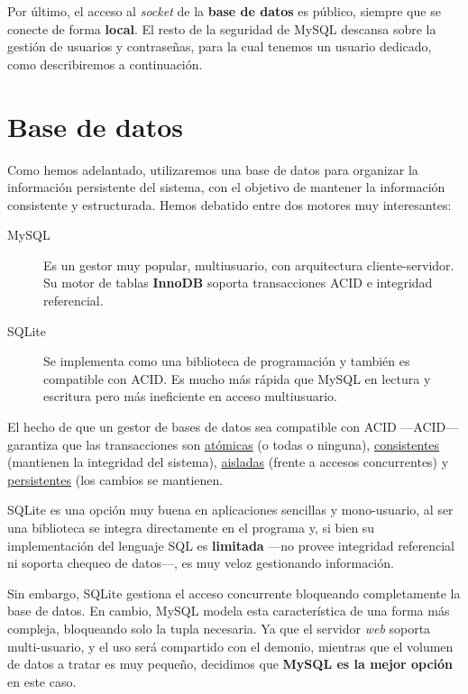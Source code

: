 Por último, el acceso al \textit{socket} de la \textbf{base de datos} es público, siempre que se conecte de forma \textbf{local}. El resto de la seguridad de MySQL descansa sobre la gestión de usuarios y contraseñas, para la cual tenemos un usuario dedicado, como describiremos a continuación.

\section{Base de datos}

Como hemos adelantado, utilizaremos una base de datos para organizar la información persistente del sistema, con el objetivo de mantener la información consistente y estructurada. Hemos debatido entre dos motores muy interesantes:

\begin{description}
	\item[MySQL] Es un gestor muy popular, multiusuario, con arquitectura cliente-servidor. Su motor de tablas \textbf{InnoDB} soporta transacciones \acrshort{ACID} e integridad referencial. \cite{wiki_innodb}
	
	\item[SQLite] Se implementa como una biblioteca de programación y también es compatible con \acrshort{ACID}. Es mucho más rápida que MySQL en lectura y escritura pero más ineficiente en acceso multiusuario.
\end{description}

El hecho de que un gestor de bases de datos sea compatible con \acrshort{ACID} ---\acrlong{ACID}--- garantiza que las transacciones son \underline{atómicas} (o todas o ninguna), \underline{consistentes} (mantienen la integridad del sistema), \underline{aisladas} (frente a accesos concurrentes) y \underline{persistentes} (los cambios se mantienen. \cite{wiki_acid}

SQLite es una opción muy buena en aplicaciones sencillas y mono-usuario, al ser una biblioteca se integra directamente en el programa y, si bien su implementación del lenguaje \acrshort{SQL} es \textbf{limitada} ---no provee integridad referencial ni soporta chequeo de datos---, es muy veloz gestionando información.

Sin embargo, SQLite gestiona el acceso concurrente bloqueando completamente la base de datos. En cambio, MySQL modela esta característica de una forma más compleja, bloqueando solo la tupla necesaria. Ya que el servidor \textit{web} soporta multi-usuario, y el uso será compartido con el demonio, mientras que el volumen de datos a tratar es muy pequeño, decidimos que \textbf{MySQL es la mejor opción} en este caso.

